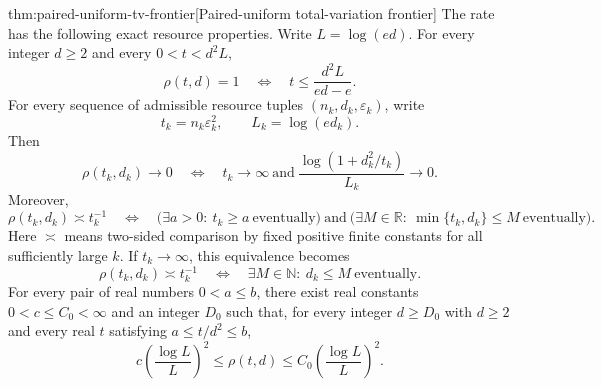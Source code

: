 \begin{theoremv}{thm:paired-uniform-tv-frontier}[Paired-uniform total-variation frontier]
The rate has the following exact resource properties. Write \(L=\log(ed)\). For every integer \(d\ge2\) and every \(0<t<d^2L\),
\[
 \rho(t,d)=1
 \quad\Longleftrightarrow\quad
 t\le\frac{d^2L}{ed-e}.
\]
For every sequence of admissible resource tuples
\((n_k,d_k,\varepsilon_k)\), write
\[
 t_k=n_k\varepsilon_k^2,\qquad L_k=\log(ed_k).
\]
Then
\[
 \rho(t_k,d_k)\longrightarrow0
 \quad\Longleftrightarrow\quad
 t_k\longrightarrow\infty
 \ \text{and}\
 \frac{\log(1+d_k^2/t_k)}{L_k}\longrightarrow0.
\]
Moreover,
\[
 \rho(t_k,d_k)\asymp t_k^{-1}
 \quad\Longleftrightarrow\quad
 \bigl(\exists a>0:\ t_k\ge a\ \text{eventually}\bigr)
 \ \text{and}\
 \bigl(\exists M\in\mathbb R:\ \min\{t_k,d_k\}\le M\
       \text{eventually}\bigr).
\]
Here \(\asymp\) means two-sided comparison by fixed positive finite constants for all sufficiently large \(k\). If \(t_k\to\infty\), this equivalence becomes
\[
 \rho(t_k,d_k)\asymp t_k^{-1}
 \quad\Longleftrightarrow\quad
 \exists M\in\mathbb N:\ d_k\le M\ \text{eventually}.
\]
For every pair of real numbers \(0<a\le b\), there exist real constants \(0<c\le C_0<\infty\) and an integer \(D_0\) such that, for every integer \(d\ge D_0\) with \(d\ge2\) and every real \(t\) satisfying \(a\le t/d^2\le b\),
\[
 c\left(\frac{\log L}{L}\right)^2
 \le \rho(t,d)
 \le C_0\left(\frac{\log L}{L}\right)^2.
\]


\end{theoremv}
